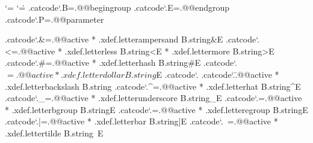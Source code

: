 \iffalse %

\edef\@@XML            {*}
\edef\@@XMLentity      {\@@XML a} %
\edef\@@XMLelement     {\@@XML b} %
\edef\@@XMLvariable    {\@@XML c} %
\edef\@@XMLvalue       {\@@XML d} %
\edef\@@XMLpars        {\@@XML e} %
\edef\@@XMLdata        {\@@XML f} %
\edef\@@XMLcode        {\@@XML g} %
\edef\@@XMLinstruction {\@@XML h} %
\edef\@@XMLmap         {\@@XML i} %
\edef\@@XMLlist        {\@@XML j} %
\edef\@@XMLnamespace   {\@@XML k} %
\edef\@@XMLurlspace    {\@@XML l} %
\edef\@@XMLescape      {\@@XML m} %
\edef\@@XMLdepth       {\@@XML n} %
\edef\@@XMLdopth       {\@@XML o} %
\edef\@@XMLsave        {\@@XML p} %

\fi

\newtoks\XMLtoks
\newtoks\XMLresetlist

\newif\ifignoreXMLspaces
\newif\iffixedXMLfont
\newif\iftraceXMLelements

\newcount\XMLlevel %
\newcount\XMLdepth %

\newtoks\everyenableXML



%
%

\chardef\XMLtokensreduction\plustwo



\bgroup
\catcode`\*=\@@comment
\catcode`\.=\@@escape
.catcode`.B=.@@begingroup
.catcode`.E=.@@endgroup
.catcode`.P=.@@parameter

.catcode`.&=.@@active * .xdef.letterampersand  B.string&E
.catcode`.<=.@@active * .xdef.letterless       B.string<E
                      * .xdef.lettermore       B.string>E
.catcode`.#=.@@active * .xdef.letterhash       B.string#E
.catcode`.$=.@@active * .xdef.letterdollar     B.string$E
.catcode`.%
.catcode`.\=.@@active * .xdef.letterbackslash  B.string\E
.catcode`.^=.@@active * .xdef.letterhat        B.string^E
.catcode`._=.@@active * .xdef.letterunderscore B.string_E
.catcode`.{=.@@active * .xdef.letterbgroup     B.string{E
.catcode`.}=.@@active * .xdef.letteregroup     B.string}E
.catcode`.|=.@@active * .xdef.letterbar        B.string|E
.catcode`.~=.@@active * .xdef.lettertilde      B.string~E

